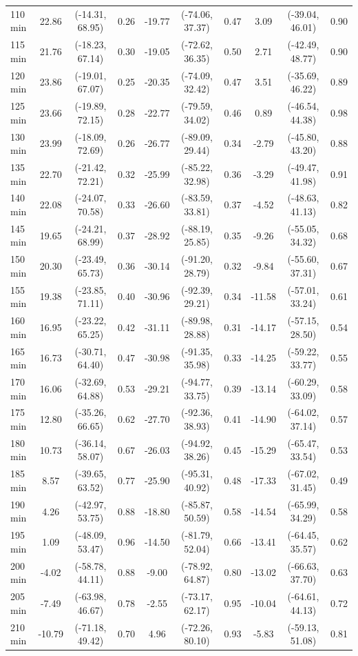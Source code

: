 \begin{table}[ht]
{\begin{tabular}{lccccccccc}
110 min & 22.86 & (-14.31, 68.95) & 0.26 & -19.77 & (-74.06, 37.37) & 0.47 & 3.09 & (-39.04, 46.01) & 0.90 \\
115 min & 21.76 & (-18.23, 67.14) & 0.30 & -19.05 & (-72.62, 36.35) & 0.50 & 2.71 & (-42.49, 48.77) & 0.90 \\
120 min & 23.86 & (-19.01, 67.07) & 0.25 & -20.35 & (-74.09, 32.42) & 0.47 & 3.51 & (-35.69, 46.22) & 0.89 \\
125 min & 23.66 & (-19.89, 72.15) & 0.28 & -22.77 & (-79.59, 34.02) & 0.46 & 0.89 & (-46.54, 44.38) & 0.98 \\
130 min & 23.99 & (-18.09, 72.69) & 0.26 & -26.77 & (-89.09, 29.44) & 0.34 & -2.79 & (-45.80, 43.20) & 0.88 \\
135 min & 22.70 & (-21.42, 72.21) & 0.32 & -25.99 & (-85.22, 32.98) & 0.36 & -3.29 & (-49.47, 41.98) & 0.91 \\
140 min & 22.08 & (-24.07, 70.58) & 0.33 & -26.60 & (-83.59, 33.81) & 0.37 & -4.52 & (-48.63, 41.13) & 0.82 \\
145 min & 19.65 & (-24.21, 68.99) & 0.37 & -28.92 & (-88.19, 25.85) & 0.35 & -9.26 & (-55.05, 34.32) & 0.68 \\
150 min & 20.30 & (-23.49, 65.73) & 0.36 & -30.14 & (-91.20, 28.79) & 0.32 & -9.84 & (-55.60, 37.31) & 0.67 \\
155 min & 19.38 & (-23.85, 71.11) & 0.40 & -30.96 & (-92.39, 29.21) & 0.34 & -11.58 & (-57.01, 33.24) & 0.61 \\
160 min & 16.95 & (-23.22, 65.25) & 0.42 & -31.11 & (-89.98, 28.88) & 0.31 & -14.17 & (-57.15, 28.50) & 0.54 \\
165 min & 16.73 & (-30.71, 64.40) & 0.47 & -30.98 & (-91.35, 35.98) & 0.33 & -14.25 & (-59.22, 33.77) & 0.55 \\
170 min & 16.06 & (-32.69, 64.88) & 0.53 & -29.21 & (-94.77, 33.75) & 0.39 & -13.14 & (-60.29, 33.09) & 0.58 \\
175 min & 12.80 & (-35.26, 66.65) & 0.62 & -27.70 & (-92.36, 38.93) & 0.41 & -14.90 & (-64.02, 37.14) & 0.57 \\
180 min & 10.73 & (-36.14, 58.07) & 0.67 & -26.03 & (-94.92, 38.26) & 0.45 & -15.29 & (-65.47, 33.54) & 0.53 \\
185 min & 8.57 & (-39.65, 63.52) & 0.77 & -25.90 & (-95.31, 40.92) & 0.48 & -17.33 & (-67.02, 31.45) & 0.49 \\
190 min & 4.26 & (-42.97, 53.75) & 0.88 & -18.80 & (-85.87, 50.59) & 0.58 & -14.54 & (-65.99, 34.29) & 0.58 \\
195 min & 1.09 & (-48.09, 53.47) & 0.96 & -14.50 & (-81.79, 52.04) & 0.66 & -13.41 & (-64.45, 35.57) & 0.62 \\
200 min & -4.02 & (-58.78, 44.11) & 0.88 & -9.00 & (-78.92, 64.87) & 0.80 & -13.02 & (-66.63, 37.70) & 0.63 \\
205 min & -7.49 & (-63.98, 46.67) & 0.78 & -2.55 & (-73.17, 62.17) & 0.95 & -10.04 & (-64.61, 44.13) & 0.72 \\
210 min & -10.79 & (-71.18, 49.42) & 0.70 & 4.96 & (-72.26, 80.10) & 0.93 & -5.83 & (-59.13, 51.08) & 0.81 \\
\bottomrule
\end{tabular}%
}
\end{table}

